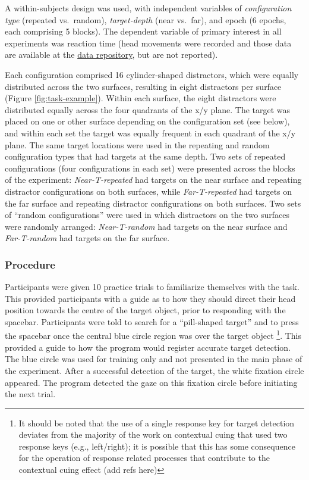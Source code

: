 \documentclass[
  man,floatsintext]{apa7}
\begin{document}
A within-subjects design was used, with independent variables of \emph{configuration type} (repeated vs.~random), \emph{target-depth} (near vs.~far), and epoch (6 epochs, each comprising 5 blocks). The dependent variable of primary interest in all experiments was reaction time (head movements were recorded and those data are available at the \href{https://github.com/tombeesley/CCVR}{data repository}, but are not reported).

Each configuration comprised 16 cylinder-shaped distractors, which were equally distributed across the two surfaces, resulting in eight distractors per surface (Figure \ref{fig:task-example}). Within each surface, the eight distractors were distributed equally across the four quadrants of the x/y plane. The target was placed on one or other surface depending on the configuration set (see below), and within each set the target was equally frequent in each quadrant of the x/y plane. The same target locations were used in the repeating and random configuration types that had targets at the same depth. Two sets of repeated configurations (four configurations in each set) were presented across the blocks of the experiment: \emph{Near-T-repeated} had targets on the near surface and repeating distractor configurations on both surfaces, while \emph{Far-T-repeated} had targets on the far surface and repeating distractor configurations on both surfaces. Two sets of ``random configurations'' were used in which distractors on the two surfaces were randomly arranged: \emph{Near-T-random} had targets on the near surface and \emph{Far-T-random} had targets on the far surface.

\hypertarget{procedure}{%
\subsubsection{Procedure}\label{procedure}}

Participants were given 10 practice trials to familiarize themselves with the task. This provided participants with a guide as to how they should direct their head position towards the centre of the target object, prior to responding with the spacebar. Participants were told to search for a ``pill-shaped target'' and to press the spacebar once the central blue circle region was over the target object \footnote{It should be noted that the use of a single response key for target detection deviates from the majority of the work on contextual cuing that used two response keys (e.g., left/right); it is possible that this has some consequence for the operation of response related processes that contribute to the contextual cuing effect (add refs here)}. This provided a guide to how the program would register accurate target detection. The blue circle was used for training only and not presented in the main phase of the experiment. After a successful detection of the target, the white fixation circle appeared. The program detected the gaze on this fixation circle before initiating the next trial.
\end{document}
